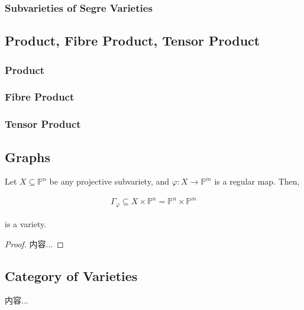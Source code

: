 \documentclass[Total.tex]{subfiles}
\begin{document}
				\subsubsection{Subvarieties of Segre Varieties}
				
				
				
			\subsection{Product, Fibre Product, Tensor Product}
			
				\subsubsection{Product}
				
				\subsubsection{Fibre Product}
				
				\subsubsection{Tensor Product}
				
			\subsection{Graphs}
				
				\begin{proposition}
					Let $X\subseteq\mathbb{P}^n$ be any projective subvariety, and $\varphi:X\rightarrow \mathbb{P}^m$ is a regular map. Then,
					
					\begin{gather*}
						\Gamma_\varphi\subseteq X\times \mathbb{P}^n= \mathbb{P}^n\times \mathbb{P}^m
					\end{gather*}
					
					is a variety.
				\end{proposition}
				
				\begin{proof}
					内容...
				\end{proof}
				
			\subsection{Category of Varieties}
			
				\begin{Def}
					内容...
				\end{Def}
				
\end{document}
